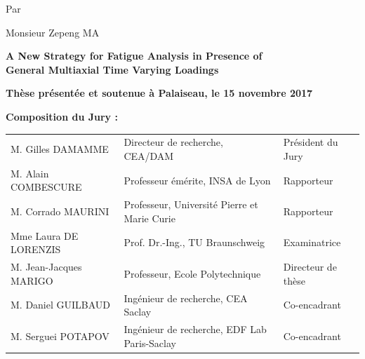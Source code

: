 \begin{titlepage}
\begin{mdframed}
\begin{minipage}[t][22cm][t]{\textwidth}
\begin{center}
{\large Par}
\vspace{12pt}

{\LARGE Monsieur Zepeng MA}
\vspace{36pt}

{\LARGE\bfseries
A New Strategy for Fatigue Analysis in Presence of 
 \\ \vspace{0.4cm}
General Multiaxial Time Varying Loadings}
\end{center}

\vfill
\begin{flushleft}
\large
\textbf{Thèse présentée et soutenue à Palaiseau, le 15 novembre 2017}
\vspace{15pt}

\textbf{Composition du Jury :}

\vspace{15pt}
\begin{tabular}{@{}lll}
M. Gilles DAMAMME & Directeur de recherche, CEA/DAM & Président du Jury \\
M. Alain COMBESCURE & Professeur émérite, INSA de Lyon & Rapporteur \\
M. Corrado MAURINI & Professeur, Université Pierre et Marie Curie & Rapporteur \\
Mme Laura DE LORENZIS & Prof. Dr.-Ing., TU Braunschweig & Examinatrice \\
M. Jean-Jacques MARIGO & Professeur, Ecole Polytechnique & Directeur de thèse \\
M. Daniel GUILBAUD & Ingénieur de recherche, CEA Saclay & Co-encadrant \\
M. Serguei POTAPOV & Ingénieur de recherche, EDF Lab Paris-Saclay & Co-encadrant
\end{tabular}
\end{flushleft}
\end{minipage}
\end{mdframed}
\end{titlepage}

\setcounter{page}{2}
\restoregeometry
